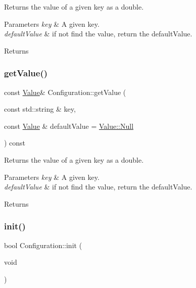 Returns the value of a given key as a double.


\begin{DoxyParams}{Parameters}
{\em key} & A given key. \\
\hline
{\em default\+Value} & if not find the value, return the default\+Value. \\
\hline
\end{DoxyParams}
\begin{DoxyReturn}{Returns}

\end{DoxyReturn}
\mbox{\label{classConfiguration_ae7193e84dd5e20ca52660784615771be}} 
\subsubsection{\texorpdfstring{get\+Value()}{getValue()}\hspace{0.1cm}{\footnotesize\ttfamily [2/2]}}
{\footnotesize\ttfamily const \hyperlink{classValue}{Value}\& Configuration\+::get\+Value (\begin{DoxyParamCaption}\item[{const std\+::string \&}]{key,  }\item[{const \hyperlink{classValue}{Value} \&}]{default\+Value = {\ttfamily \hyperlink{classValue_af01b27b1c6ca5f4577a4b6c10a186f59}{Value\+::\+Null}} }\end{DoxyParamCaption}) const}

Returns the value of a given key as a double.


\begin{DoxyParams}{Parameters}
{\em key} & A given key. \\
\hline
{\em default\+Value} & if not find the value, return the default\+Value. \\
\hline
\end{DoxyParams}
\begin{DoxyReturn}{Returns}

\end{DoxyReturn}
\mbox{\label{classConfiguration_a4eac7383dc99601820516eef2d1dce85}} 
\subsubsection{\texorpdfstring{init()}{init()}\hspace{0.1cm}{\footnotesize\ttfamily [1/2]}}
{\footnotesize\ttfamily bool Configuration\+::init (\begin{DoxyParamCaption}\item[{void}]{ }\end{DoxyParamCaption})}


